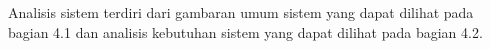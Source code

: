 Analisis sistem terdiri dari gambaran umum sistem yang dapat dilihat pada bagian 4.1 dan analisis kebutuhan sistem yang dapat dilihat pada bagian 4.2.
